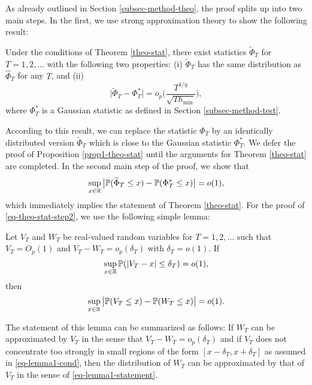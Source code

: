 \documentclass[a4paper,12pt]{article}
\numberwithin{equation}{section}
\begin{document}
As already outlined in Section \ref{subsec-method-theo}, the proof splits up into two main steps. In the first, we use strong approximation theory to show the following result: 
\begin{propA}\label{prop1-theo-stat}
Under the conditions of Theorem \ref{theo-stat}, there exist statistics $\widetilde{\Phi}_T$ for $T = 1,2,\ldots$ with the following two properties: (i) $\widetilde{\Phi}_T$ has the same distribution as $\widehat{\Phi}_T$ for any $T$, and (ii)
\[ \big| \widetilde{\Phi}_T - \Phi_T^* \big| = o_p \Big( \frac{T^{1/q}}{\sqrt{T h_{\min}}} \Big), \]
where $\Phi_T^*$ is a Gaussian statistic as defined in Section \ref{subsec-method-test}. 
\end{propA}
According to this result, we can replace the statistic $\widehat{\Phi}_T$ by an identically distributed version $\widetilde{\Phi}_T$ which is close to the Gaussian statistic $\Phi_T^*$. We defer the proof of Proposition \ref{prop1-theo-stat} until the arguments for Theorem \ref{theo-stat} are completed. In the second main step of the proof, we show that 
\begin{equation}\label{eq-theo-stat-step2}
\sup_{x \in \mathbb{R}} \big| \mathbb{P}(\widetilde{\Phi}_T \le x) - \mathbb{P}(\Phi_T^* \le x) \big| = o(1), 
\end{equation}
which immediately implies the statement of Theorem \ref{theo-stat}. For the proof of \eqref{eq-theo-stat-step2}, we use the following simple lemma: 
\begin{lemmaA}\label{lemma1-theo-stat}
Let $V_T$ and $W_T$ be real-valued random variables for $T = 1,2,\ldots$ such that $V_T = O_p(1)$ and $V_T - W_T = o_p(\delta_T)$ with $\delta_T = o(1)$. If 
\begin{equation}\label{eq-lemma1-cond}
\sup_{x \in \mathbb{R}} \mathbb{P}(|V_T - x| \le \delta_T) = o(1), 
\end{equation}
then 
\begin{equation}\label{eq-lemma1-statement}
\sup_{x \in \mathbb{R}} \big| \mathbb{P}(V_T \le x) - \mathbb{P}(W_T \le x) \big| = o(1). 
\end{equation}
\end{lemmaA}
The statement of this lemma can be summarized as follows: If $W_T$ can be approximated by $V_T$ in the sense that $V_T - W_T = o_p(\delta_T)$ and if $V_T$ does not concentrate too strongly in small regions of the form $[x - \delta_T,x+\delta_T]$ as assumed in \eqref{eq-lemma1-cond}, then the distribution of $W_T$ can be approximated by that of $V_T$ in the sense of \eqref{eq-lemma1-statement}.
\end{document}
